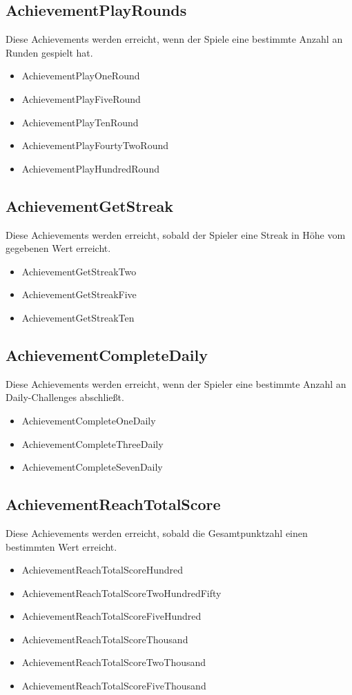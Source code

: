 \documentclass[a4paper]{scrreprt}
\begin{document}
	\subsection{AchievementPlayRounds}
	Diese Achievements werden erreicht, wenn der Spiele eine bestimmte Anzahl an Runden gespielt hat. \\
	\begin{itemize}
		\item AchievementPlayOneRound
		\item AchievementPlayFiveRound
		\item AchievementPlayTenRound
		\item AchievementPlayFourtyTwoRound
		\item AchievementPlayHundredRound
	\end{itemize}

	\subsection{AchievementGetStreak}
	Diese Achievements werden erreicht, sobald der Spieler eine Streak in Höhe vom gegebenen Wert erreicht. \\
	\begin{itemize}
		\item AchievementGetStreakTwo
		\item AchievementGetStreakFive
		\item AchievementGetStreakTen
	\end{itemize}

	\newpage
	\subsection{AchievementCompleteDaily}
	Diese Achievements werden erreicht, wenn der Spieler eine bestimmte Anzahl an Daily-Challenges abschließt. \\
	\begin{itemize}
		\item AchievementCompleteOneDaily
		\item AchievementCompleteThreeDaily
		\item AchievementCompleteSevenDaily
	\end{itemize}

	\subsection{AchievementReachTotalScore}
	Diese Achievements werden erreicht, sobald die Gesamtpunktzahl einen bestimmten Wert erreicht. \\
	\begin{itemize}
		\item AchievementReachTotalScoreHundred
		\item AchievementReachTotalScoreTwoHundredFifty
		\item AchievementReachTotalScoreFiveHundred
		\item AchievementReachTotalScoreThousand
		\item AchievementReachTotalScoreTwoThousand
		\item AchievementReachTotalScoreFiveThousand
	\end{itemize}
\end{document}
